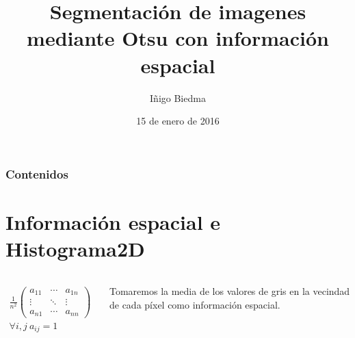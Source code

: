 \documentclass{beamer}
\title[Otsu2D]{Segmentación de imagenes mediante Otsu con información espacial} %
\author{Iñigo Biedma} %
\institute[UPNA] %
{
Visión Artificial \\ %
\medskip
Semestre Otoño 2015
}
\date{15 de enero de 2016} %
\begin{document}
\begin{frame}
\titlepage %
\end{frame}

\begin{frame}
\frametitle{Contenidos} %
\tableofcontents %
\end{frame}

\section{Información espacial e Histograma2D} %

\begin{frame}
\begin{columns}[c]
\begin{align*} 
\frac{1}{n^2}\begin{pmatrix}
 a_{11} & \cdots & a_{1n}\\ 
 \vdots & \ddots & \vdots\\ 
 a_{n1} & \cdots & a_{nn}
 \end{pmatrix}\\
 \forall i,j\ a_{ij}=1
\end{align*}

Tomaremos la media de los valores de gris en la vecindad de cada píxel como información espacial.

\end{columns}
\end{frame}
\end{document}
